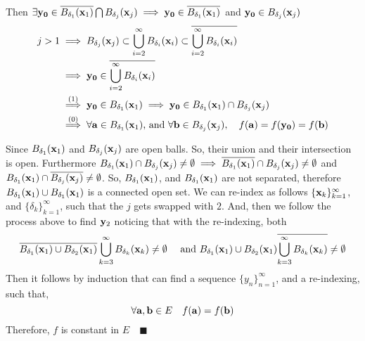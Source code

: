 \documentclass{article}
\begin{document}
Then $\exists \vb{y_0}\in  \overline{B_{\delta_1}(\vb{x}_1)}
\bigcap   B_{\delta_j}(\vb{x}_j) \implies
\vb{y_0}\in
\overline{B_{\delta_1}(\vb{x}_1)}$
and $\vb{y_0} \in  B_{\delta_j}(\vb{x}_j) $
\begin{align*}
 j > 1 &\implies   B_{\delta_j}(\vb{x}_j)
  \subset \bigcup_{i=2}^\infty
  B_{\delta_i}(\vb{x}_i) \subset \overline{\bigcup_{i=2}^\infty
  B_{\delta_i}(\vb{x}_i)}\\
                               &\implies \vb{y_0}  \in \overline{\bigcup_{i=2}^\infty
  B_{\delta_i}(\vb{x}_i)}\\
                               &\overset{\text{(1)}}{\implies}
                                 \vb{y_0} \in
                                 B_{\delta_1}(\vb{x}_1) \implies
                                 \vb{y_0} \in
                                 B_{\delta_1}(\vb{x}_1) \cap  B_{\delta_j}(\vb{x}_j)\\
                               &\overset{\text{(0)}}{\implies} \forall \vb{a}\in
                                 B_{\delta_1}(\vb{x}_1)\text{, and
                                 }\forall \vb{b} \in B_{\delta_j}(\vb{x}_j),\quad  f(\vb{a}) = f(\vb{y_0}) = f(\vb{b})
\end{align*}

Since $B_{\delta_1}(\vb{x}_1)$ and $B_{\delta_j}(\vb{x}_j)$ are open balls. So, their union and their intersection is open. Furthermore $B_{\delta_1}(\vb{x}_1)\cap B_{\delta_j}(\vb{x}_j)\neq
\emptyset \implies \overline{B_{\delta_1}(\vb{x}_1)}\cap B_{\delta_j}(\vb{x}_j)\neq
\emptyset$ and $B_{\delta_1}(\vb{x}_1)\cap\overline{ B_{\delta_j}(\vb{x}_j)}\neq
\emptyset$. So, $B_{\delta_1}(\vb{x}_1)$, and $B_{\delta_1}(\vb{x}_1)$
are not separated, therefore $B_{\delta_1}(\vb{x}_1) \cup
B_{\delta_1}(\vb{x}_1)$ is a connected open set. We can re-index
as follows
$\{\vb{x}_k\}_{k=1}^\infty$, and $\{\delta_k\}_{k=1}^\infty$, such
that the $j$ gets swapped with $2$. And, then we follow the process
above to find $\vb{y}_2$ noticing that with the re-indexing, both
\[\overline{B_{\delta_1}(\vb{x}_1)\cup B_{\delta_2}(\vb{x}_1)}
  \bigcup_{k=3}^\infty B_{\delta_k}(\vb{x}_k)\neq \emptyset\quad\text{ and }B_{\delta_1}(\vb{x}_1)\cup B_{\delta_2}(\vb{x}_1)
  \overline{\bigcup_{k=3}^\infty B_{\delta_k}(\vb{x}_k)}\neq \emptyset\]
Then it follows by induction that can find a sequence $\{y_n\}_{n=
  1}^\infty$, and a re-indexing, such that,
\[\forall \vb{a},\vb{b}\in E\quad  f(\vb{a})= f(\vb{b})\]
Therefore, $f$ is constant in $E\quad \blacksquare$
\end{document}

